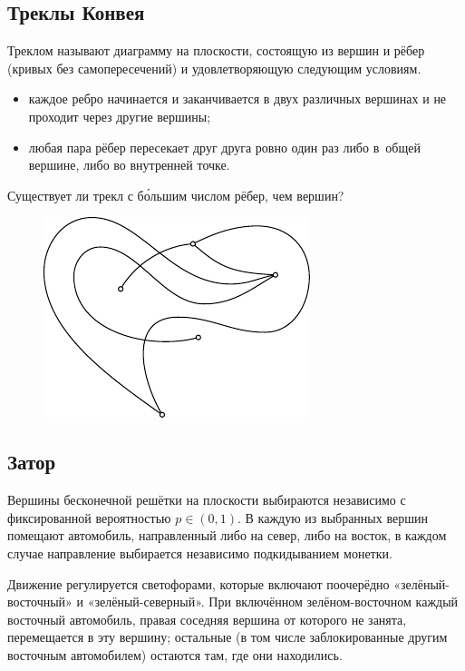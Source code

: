 \documentclass[twoside]{book}
\makeatletter
\newcommand{\rindex}[2][\imki@jobname]{%
  \index[#1]{\detokenize{#2}}%
}
\makeatother
\begin{document}
\subsection*{Треклы Конвея}
\rindex{Треклы Конвея}

Треклом называют диаграмму на плоскости, состоящую из вершин и рёбер (кривых без самопересечений) и удовлетворяющую следующим условиям.
\begin{itemize}[noitemsep,leftmargin=\parindent,labelsep=3.5pt]
\item каждое ребро начинается и заканчивается в двух различных вершинах и не проходит через другие вершины;
\item любая пара рёбер пересекает друг друга ровно один раз либо в~общей вершине, либо во внутренней точке.
\end{itemize}

Существует ли трекл с б\'{о}льшим числом рёбер, чем вершин?

\begin{figure}[!ht]
\centering
\includegraphics{mp/wink-29}
\end{figure}

\subsection*{Затор}
\rindex{Затор}

Вершины бесконечной решётки на плоскости выбираются независимо с фиксированной вероятностью $p\in (0,1)$.
В каждую из выбранных вершин помещают автомобиль, направленный либо на север, либо на восток,
в каждом  случае направление выбирается независимо подкидыванием монетки.

Движение регулируется светофорами, которые включают поочерёдно «зелёный-восточный» и «зелёный-северный».
При включённом зелёном-восточном каждый восточный автомобиль, правая соседняя вершина от которого не занята, перемещается в эту вершину; остальные (в том числе заблокированные другим восточным автомобилем) остаются там, где они находились.
\end{document}

